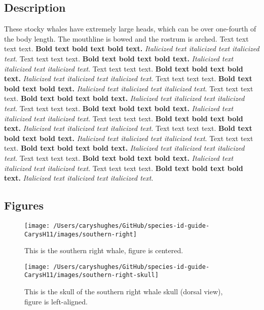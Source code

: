 \documentclass[
]{article}
\begin{document}
\hypertarget{description}{%
\subsection{Description}\label{description}}

These stocky whales have extremely large heads, which can be over
one-fourth of the body length. The mouthline is bowed and the rostrum is
arched. Text text text text. \textbf{Bold text bold text bold text.}
\emph{Italicized text italicized text italicized text}. Text text text
text. \textbf{Bold text bold text bold text.} \emph{Italicized text
italicized text italicized text}. Text text text text. \textbf{Bold text
bold text bold text.} \emph{Italicized text italicized text italicized
text}. Text text text text. \textbf{Bold text bold text bold text.}
\emph{Italicized text italicized text italicized text}. Text text text
text. \textbf{Bold text bold text bold text.} \emph{Italicized text
italicized text italicized text}. Text text text text. \textbf{Bold text
bold text bold text.} \emph{Italicized text italicized text italicized
text}. Text text text text. \textbf{Bold text bold text bold text.}
\emph{Italicized text italicized text italicized text}. Text text text
text. \textbf{Bold text bold text bold text.} \emph{Italicized text
italicized text italicized text}. Text text text text. \textbf{Bold text
bold text bold text.} \emph{Italicized text italicized text italicized
text}. Text text text text. \textbf{Bold text bold text bold text.}
\emph{Italicized text italicized text italicized text}. Text text text
text. \textbf{Bold text bold text bold text.} \emph{Italicized text
italicized text italicized text}.

\newpage

\hypertarget{figures}{%
\subsection{Figures}\label{figures}}

\begin{figure}

\texttt{[image: /Users/caryshughes/GitHub/species-id-guide-CarysH11/images/southern-right]} \hfill{}

\caption{This is the southern right whale, figure is centered.}\label{fig:southern-right-whale}
\end{figure}

\begin{figure}

\texttt{[image: /Users/caryshughes/GitHub/species-id-guide-CarysH11/images/southern-right-skull]} \hfill{}

\caption{This is the skull of the southern right whale skull (dorsal view), figure is left-aligned.}\label{fig:southern-right-whale-skull}
\end{figure}
\end{document}
